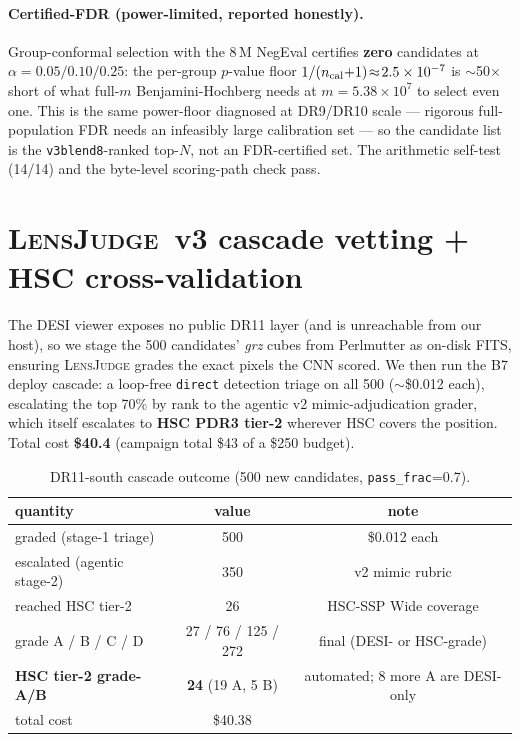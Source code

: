 \documentclass[11pt,letterpaper]{article}
\newcommand{\lj}{\textsc{LensJudge}}
\newcommand{\vb}{\texttt{v3blend8}}
\begin{document}
\paragraph{Certified-FDR (power-limited, reported honestly).} Group-conformal selection
\citep{jin2023conformal} with the 8\,M NegEval certifies \textbf{zero} candidates at
$\alpha=0.05/0.10/0.25$: the per-group $p$-value floor $1/(n_{\rm cal}{+}1)\!\approx\!2.5\times10^{-7}$
is $\sim$50$\times$ short of what full-$m$ Benjamini-Hochberg needs at $m\!=\!5.38\times10^{7}$ to
select even one. This is the same power-floor diagnosed at DR9/DR10 scale --- rigorous full-population
FDR needs an infeasibly large calibration set --- so the candidate list is the \vb{}-ranked top-$N$,
not an FDR-certified set. The arithmetic self-test (14/14) and the byte-level scoring-path check pass.

\section{\lj{}~v3 cascade vetting + HSC cross-validation}
\label{sec:vet}
The DESI viewer exposes no public DR11 layer (and is unreachable from our host), so we stage the 500
candidates' \emph{grz} cubes from Perlmutter as on-disk FITS, ensuring \lj{} grades the exact pixels
the CNN scored. We then run the B7 deploy cascade: a loop-free \texttt{direct}
detection triage on all 500 ($\sim$\$0.012 each), escalating the top 70\% by rank to the agentic v2
mimic-adjudication grader, which itself escalates to \textbf{HSC PDR3 tier-2} wherever HSC covers the
position. Total cost \textbf{\$40.4} (campaign total \$43 of a \$250 budget).

\begin{table}[t]\centering
\caption{DR11-south cascade outcome (500 new candidates, \texttt{pass\_frac}=0.7).}
\label{tab:cascade}
\begin{tabular}{lcc}
\toprule
quantity & value & note\\
\midrule
graded (stage-1 triage)        & 500 & \$0.012 each\\
escalated (agentic stage-2)    & 350 & v2 mimic rubric\\
reached HSC tier-2             & 26  & HSC-SSP Wide coverage\\
\midrule
grade A / B / C / D            & 27 / 76 / 125 / 272 & final (DESI- or HSC-grade)\\
\textbf{HSC tier-2 grade-A/B}  & \textbf{24} (19 A, 5 B) & automated; 8 more A are DESI-only\\
total cost                     & \$40.38 & \\
\bottomrule
\end{tabular}
\end{table}
\end{document}

